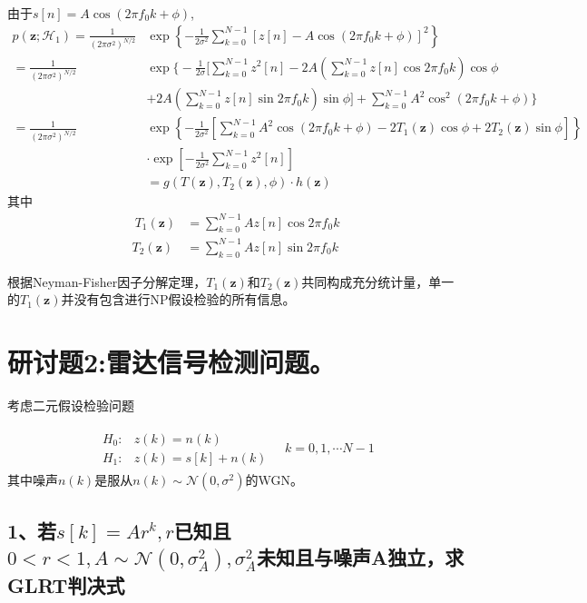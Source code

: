 \documentclass[fontset=windows]{article}
\numberwithin{figure}{section}
\begin{document}
由于\(s[n]=A\cos (2\pi f_0 k+\phi)\),
\begin{align*}
    p(\mathbf{z};\mathcal{H}_1)
    =  \frac{1}{(2\pi \sigma^2)^{N/2}}
     & \exp\left\{-\frac{1}{2\sigma^2}\sum_{k=0}^{N-1}[z[n]-A\cos (2\pi f_0 k+\phi)]^2 \right\}                                                        \\
    =  \frac{1}{(2\pi \sigma^2)^{N/2}}
     & \exp\bigg\{-\frac{1}{2\sigma}\bigg[\sum_{k=0}^{N-1}z^2[n]-2A\left(\sum_{k=0}^{N-1}z[n]\cos2\pi f_0 k\right)\cos \phi                            \\
     & +2A\left(\sum_{k=0}^{N-1}z[n]\sin 2\pi f_0 k\right)\sin \phi\bigg] +\sum_{k=0}^{N-1}A^2\cos^2 (2\pi f_0 k +\phi)\bigg\}                         \\
    = \frac{1}{(2\pi \sigma^2)^{N/2}}
     & \exp\left\{-\frac{1}{2\sigma^2}\left[\sum_{k=0}^{N-1}A^2\cos(2\pi f_0 k+\phi)-2T_1(\mathbf{z})\cos\phi+2T_2(\mathbf{z})\sin \phi\right]\right\} \\
     & \cdot \exp\left[-\frac{1}{2\sigma^2}\sum_{k=0}^{N-1}z^2[n]\right]                                                                               \\
     & =g(T(\mathbf{z}),T_2(\mathbf{z}),\phi)\cdot h(\mathbf{z})
\end{align*}
其中
\begin{align*}\
    T_1(\mathbf{z}) & =\sum_{k=0}^{N-1}Az[n]\cos2\pi f_0 k \\
    T_2(\mathbf{z}) & =\sum_{k=0}^{N-1}Az[n]\sin2\pi f_0 k
\end{align*}

根据Neyman-Fisher因子分解定理，\(T_1(\mathbf{z})\)和\(T_2(\mathbf{z})\)共同构成充分统计量，单一的\(T_1(\mathbf{z})\)并没有包含进行NP假设检验的所有信息。

\section{研讨题2:雷达信号检测问题。}
考虑二元假设检验问题

\begin{align*}
    \begin{matrix}
        H_0: & z(k)=n(k)      \\
        H_1: & z(k)=s[k]+n(k)
    \end{matrix}\quad k=0,1,\cdots N-1
\end{align*}
其中噪声\(n(k)\)是服从\(n(k)\sim \mathcal{N}(0,\sigma^2)\)的WGN。

\subsection*{1、若\(s[k]=Ar^k,r\)已知且\(0<r<1,A\sim \mathcal{N}(0,\sigma^2_A),\sigma^2_A\)未知且与噪声A独立，求GLRT判决式}
\end{document}
